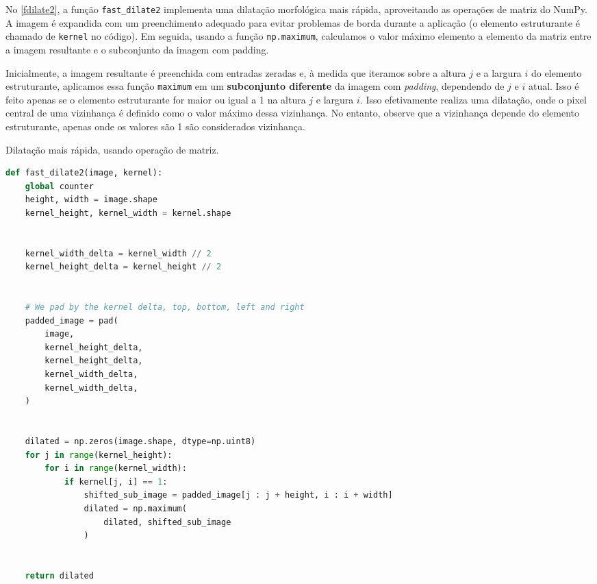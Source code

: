 \documentclass[english, 
               brazil, 
               bsc] %
               {dcomp-abntex2}
\begin{document}
No \autoref{fdilate2}, a função \texttt{fast\_dilate2} implementa uma dilatação morfológica mais rápida, aproveitando as operações de matriz do NumPy. A imagem é expandida com um preenchimento adequado para evitar problemas de borda durante a aplicação (o elemento estruturante é chamado de \texttt{kernel} no código). Em seguida, usando a função \texttt{np.maximum}, calculamos o valor máximo elemento a elemento da matriz entre a imagem resultante e o subconjunto da imagem com padding.


Inicialmente, a imagem resultante é preenchida com entradas zeradas e, à medida que iteramos sobre a altura $j$ e a largura $i$ do elemento estruturante, aplicamos essa função \texttt{maximum} em um  \textbf{subconjunto diferente} da imagem com \textit{padding}, dependendo de $j$ e $i$ atual. Isso é feito apenas se o elemento estruturante for maior ou igual a 1 na altura $j$ e largura $i$. Isso efetivamente realiza uma dilatação, onde o pixel central de uma vizinhança é definido como o valor máximo dessa vizinhança. No entanto, observe que a vizinhança depende do elemento estruturante, apenas onde os valores são 1 são considerados vizinhança.


\begin{codigo}[h]
  \caption{\small Dilatação mais rápida, usando operação de matriz.}
 \label{fdilate2}
\begin{lstlisting}[language=python]
def fast_dilate2(image, kernel):
    global counter 
    height, width = image.shape
    kernel_height, kernel_width = kernel.shape


    kernel_width_delta = kernel_width // 2
    kernel_height_delta = kernel_height // 2


    # We pad by the kernel delta, top, bottom, left and right
    padded_image = pad(
        image,
        kernel_height_delta,
        kernel_height_delta,
        kernel_width_delta,
        kernel_width_delta,
    )


    dilated = np.zeros(image.shape, dtype=np.uint8)
    for j in range(kernel_height):
        for i in range(kernel_width):
            if kernel[j, i] == 1:
                shifted_sub_image = padded_image[j : j + height, i : i + width]
                dilated = np.maximum(
                    dilated, shifted_sub_image
                )


    return dilated
\end{lstlisting}
\end{codigo}
\end{document}
